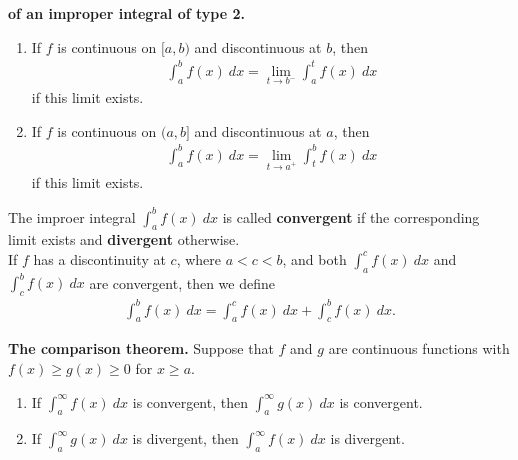 \documentclass{article}
\begin{document}
\begin{definition}
    \textbf{of an improper integral of type 2.}
    \begin{enumerate}
        \item If $f$ is continuous on $[a,b)$ and discontinuous at $b$, then
        \begin{align*}
            \int_a^b f(x)\:dx = \lim_{t\to b^-}\int_a^t f(x)\: dx
        \end{align*}
        if this limit exists.
        \item If $f$ is continuous on $(a,b]$ and discontinuous at $a$, then
        \begin{align*}
            \int_a^b f(x)\:dx = \lim_{t\to a^+}\int_t^b f(x)\: dx
        \end{align*}
        if this limit exists.
    \end{enumerate}
    The improer integral $\int_a^b f(x)\:dx$ is called \textbf{convergent} if the corresponding limit exists and \textbf{divergent} otherwise.\\
    If $f$ has a discontinuity at $c$, where $a<c<b$, and both $\int_a^c f(x)\:dx$ and $\int_c^b f(x)\:dx$ are convergent, then we define
    \begin{align*}
        \int_a^b f(x)\: dx = \int_a^c f(x)\:dx + \int_c^b f(x)\:dx.
    \end{align*}
\end{definition}
\begin{theorem}
    \textbf{The comparison theorem.} Suppose that $f$ and $g$ are continuous functions with $f(x)\geq g(x)\geq 0$ for $x\geq a$.
    \begin{enumerate}
        \item If $\int_a^\infty f(x)\:dx$ is convergent, then $\int_a^\infty g(x)\:dx$ is convergent.
        \item If $\int_a^\infty g(x)\:dx$ is divergent, then $\int_a^\infty f(x)\:dx$ is divergent.
    \end{enumerate}
\end{theorem}
\end{document}
